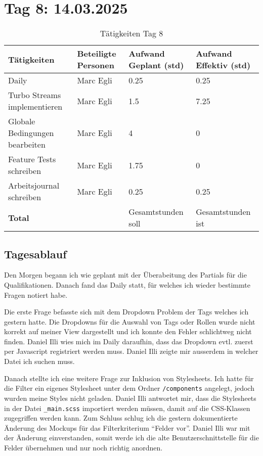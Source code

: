 \section{Tag 8: 14.03.2025}
\begin{table}[H]
    \begin{tabular}{|L{0.4\textwidth}|C{60pt}|C{60pt}|C{60pt}|}
        \hline
        \color{white}Tätigkeiten & \color{white}Beteiligte \color{white}Personen & \color{white}Aufwand Geplant (std) & \color{white}Aufwand Effektiv (std) \\
        \hline
        Daily & Marc Egli & 0.25 & 0.25 \\
        \hline
        Turbo Streams implementieren & Marc Egli & 1.5 & 7.25 \\
        \hline
        Globale Bedingungen bearbeiten & Marc Egli & 4 & 0 \\
        \hline
        Feature Tests schreiben & Marc Egli & 1.75 & 0 \\
        \hline
        Arbeitsjournal schreiben & Marc Egli & 0.25 & 0.25 \\
        \textbf{Total} &  & Gesamtstunden soll & Gesamtstunden ist \\
        \hline
    \end{tabular}
    \caption{Tätigkeiten Tag 8}
\end{table}

\subsection*{Tagesablauf}
Den Morgen begann ich wie geplant mit der Überabeitung des Partials für die Qualifikationen. Danach fand das Daily statt, für welches ich wieder
bestimmte Fragen notiert habe.

Die erste Frage befasste sich mit dem Dropdown Problem der Tags welches ich gestern hatte. Die Dropdowns für die Auswahl von Tags oder Rollen wurde nicht korrekt
auf meiner View dargestellt und ich konnte den Fehler schlichtweg nicht finden. Daniel Illi wies mich im Daily daraufhin, dass
das Dropdown evtl. zuerst per Javascript registriert werden muss. Daniel Illi zeigte mir ausserdem in welcher Datei ich suchen muss.

Danach stellte ich eine weitere Frage zur Inklusion von Stylesheets. Ich hatte für die Filter ein eigenes Stylesheet unter dem Ordner \texttt{/components}
angelegt, jedoch wurden meine Styles nicht geladen. Daniel Illi antwortet mir, dass die Stylesheets in der Datei \texttt{\_main.scss} importiert werden müssen,
damit auf die CSS-Klassen zugegriffen werden kann. Zum Schluss schlug ich die gestern dokumentierte Änderung des Mockups für das Filterkriterium ``Felder vor''.
Daniel Illi war mit der Änderung einverstanden, somit werde ich die alte Benutzerschnittstelle für die Felder übernehmen und nur noch richtig anordnen.

